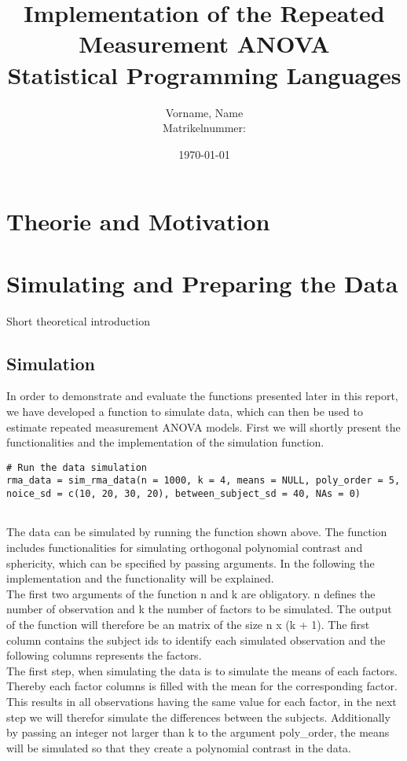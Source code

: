 \documentclass[11pt]{article}
\author{Vorname, Name\\Matrikelnummer: }
\title{\textbf{Implementation of the Repeated Measurement ANOVA}\\ Statistical Programming Languages \\[5cm]}
\date{\today}
\begin{document}
	\maketitle
	\thispagestyle{fancy}
	\newpage
	\tableofcontents
	\newpage
	\section{Theorie and Motivation}
	\section{Simulating and Preparing the Data}
	Short theoretical introduction
		\subsection{Simulation}
				 In order to demonstrate and evaluate the functions presented later in this report, we have developed a function to simulate data, which can then be used to estimate repeated measurement ANOVA models. First we will shortly present the functionalities and the implementation of the simulation function.\\
				 
\begin{lstlisting}
# Run the data simulation
rma_data = sim_rma_data(n = 1000, k = 4, means = NULL, poly_order = 5, noice_sd = c(10, 20, 30, 20), between_subject_sd = 40, NAs = 0)
				 
\end{lstlisting}
				 
				 The data can be simulated by running the function shown above. The function includes functionalities for simulating orthogonal polynomial contrast and sphericity, which can be specified by passing arguments. In the following the implementation and the functionality will be explained.\\
				 
				 The first two arguments of the function n and k are obligatory. n defines the number of observation and k the number of factors to be simulated. The output of the function will therefore be an matrix of the size n x (k + 1). The first column contains the subject ids to identify each simulated observation and the following columns represents the factors.\\
				 
				 The first step, when simulating the data is to simulate the means of each factors. Thereby each factor columns is filled with the mean for the corresponding factor. This results in all observations having the same value for each factor, in the next step we will therefor simulate the differences between the subjects.  Additionally by passing an integer not larger than k to the argument poly\_order, the means will be simulated so that they create a polynomial contrast in the data.\\
					
\end{document}
